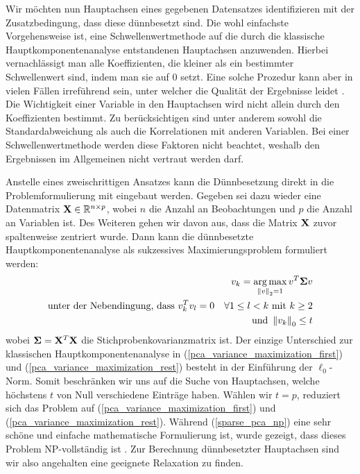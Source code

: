 Wir möchten nun Hauptachsen eines gegebenen Datensatzes identifizieren mit der Zusatzbedingung, dass diese dünnbesetzt sind. Die wohl einfachste Vorgehensweise ist, eine Schwellenwertmethode auf die durch die klassische Hauptkomponentenanalyse entstandenen Hauptachsen anzuwenden. Hierbei vernachlässigt man alle Koeffizienten, die kleiner als ein bestimmter Schwellenwert sind, indem man sie auf 0 setzt. Eine solche Prozedur kann aber in vielen Fällen irreführend sein, unter welcher die Qualität der Ergebnisse leidet \cite{cadima}. Die Wichtigkeit einer Variable in den Hauptachsen wird nicht allein durch den Koeffizienten bestimmt. Zu berücksichtigen sind unter anderem sowohl die Standardabweichung als auch die Korrelationen mit anderen Variablen. Bei einer Schwellenwertmethode werden diese Faktoren nicht beachtet, weshalb den Ergebnissen im Allgemeinen nicht vertraut werden darf.

Anstelle eines zweischrittigen Ansatzes kann die Dünnbesetzung direkt in die Problemformulierung mit eingebaut werden. Gegeben sei dazu wieder eine Datenmatrix $\mathbf{X} \in \mathbb{R}^{n \times p}$, wobei $n$ die Anzahl an Beobachtungen und $p$ die Anzahl an Variablen ist. Des Weiteren gehen wir davon aus, dass die Matrix $\mathbf{X}$ zuvor spaltenweise zentriert wurde. Dann kann die dünnbesetzte Hauptkomponentenanalyse als sukzessives Maximierungsproblem formuliert werden:
\begin{gather}
\label{sparse_pca_np}
\begin{split}
v_{k} = \operatorname*{arg\,max}_{\left\lVert v \right\rVert_2 = 1} v^{T}\mathbf{\Sigma} v\\
\text{unter der Nebendingung, dass } v_{k}^Tv_{l} = 0 \quad \forall 1 \leq l < k \text{ mit } k\geq 2\\
\text{und } \left\lVert v_{k} \right\rVert_0 \leq t 
\end{split}
\end{gather}
wobei $\mathbf{\Sigma} = \mathbf{X}^T \mathbf{X}$ die Stichprobenkovarianzmatrix ist. Der einzige Unterschied zur klassischen Hauptkomponentenanalyse in (\ref{pca_variance_maximization_first}) und (\ref{pca_variance_maximization_rest}) besteht in der Einführung der $\ell_0$-Norm. Somit beschränken wir uns auf die Suche von Hauptachsen, welche höchstens $t$ von Null verschiedene Einträge haben. Wählen wir $t = p$, reduziert sich das Problem auf (\ref{pca_variance_maximization_first}) und (\ref{pca_variance_maximization_rest}). Während (\ref{sparse_pca_np}) eine sehr schöne und einfache mathematische Formulierung ist, wurde gezeigt, dass dieses Problem NP-vollständig ist \cite{foucart}. Zur Berechnung dünnbesetzter Hauptachsen sind wir also angehalten eine geeignete Relaxation zu finden.



